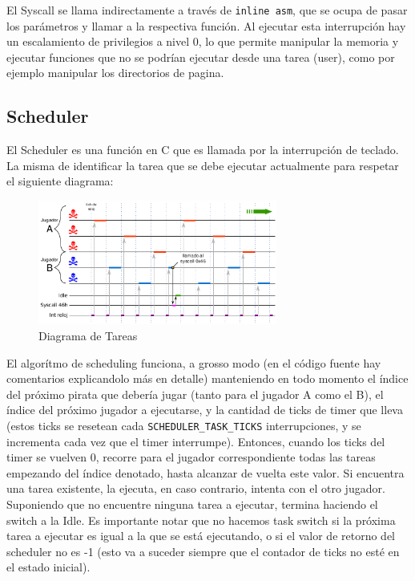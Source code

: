 El Syscall se llama indirectamente a través de \texttt{inline asm}, que se ocupa de pasar los parámetros y llamar a la respectiva función. Al ejecutar esta interrupción hay un escalamiento de privilegios a nivel 0, lo que permite manipular la memoria y ejecutar funciones que no se podrían ejecutar desde una tarea (user), como por ejemplo manipular los directorios de pagina.

\subsection{Scheduler}

El Scheduler es una función en C que es llamada por la interrupción de teclado. La misma de identificar la tarea que se debe ejecutar actualmente para respetar el siguiente diagrama:

\begin{figure}[H]
  \centering
    \includegraphics[width=0.7\textwidth]{images/scheduler}
  \caption{Diagrama de Tareas}
\end{figure}

El algorítmo de scheduling funciona, a grosso modo (en el código fuente hay comentarios explicandolo más en detalle) manteniendo en todo momento el índice del próximo pirata que debería jugar (tanto para el jugador A como el B), el índice del próximo jugador a ejecutarse, y la cantidad de ticks de timer que lleva (estos ticks se resetean cada \texttt{SCHEDULER\_TASK\_TICKS} interrupciones, y se incrementa cada vez que el timer interrumpe). Entonces, cuando los ticks del timer se vuelven 0, recorre para el jugador correspondiente todas las tareas empezando del índice denotado, hasta alcanzar de vuelta este valor. Si encuentra una tarea existente, la ejecuta, en caso contrario, intenta con el otro jugador. Suponiendo que no encuentre ninguna tarea a ejecutar, termina haciendo el switch a la Idle. Es importante notar que no hacemos task switch si la próxima tarea a ejecutar es igual a la que se está ejecutando, o si el valor de retorno del scheduler no es -1 (esto va a suceder siempre que el contador de ticks no esté en el estado inicial).

